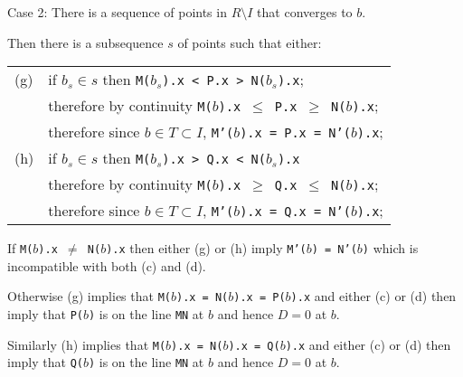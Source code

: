 \documentclass[12pt]{article}
\begin{document}
\begin{indpar}{0.3in}
Case 2: There is a sequence of points in $R\setminus I$ that
converges to $b$.

Then there is a subsequence $s$ of points such that either:
\begin{center}
\begin{tabular}{ll}
(g) & if $b_s\in s$ then {\tt M($b_s$).x < P.x > N($b_s$).x}; \\
    & therefore by continuity
            {\tt M($b$).x $\leq$ P.x $\geq$ N($b$).x}; \\
    & therefore since $b\in T\subset I$,
            {\tt M'($b$).x = P.x = N'($b$).x}; \\
(h) & if $b_s\in s$ then {\tt M($b_s$).x > Q.x < N($b_s$).x} \\
    & therefore by continuity
            {\tt M($b$).x $\geq$ Q.x $\leq$ N($b$).x}; \\
    & therefore since $b\in T\subset I$,
            {\tt M'($b$).x = Q.x = N'($b$).x}; \\
\end{tabular}
\end{center}
If {\tt M($b$).x $\neq$ N($b$).x} then either (g) or (h) imply
{\tt M'($b$) = N'($b$)} which is incompatible with both (c) and (d).

Otherwise (g) implies that {\tt M($b$).x = N($b$).x = P($b$).x} and
either (c) or (d) then imply that {\tt P($b$)} is on the line
{\tt MN} at $b$ and hence $D=0$ at $b$.

Similarly (h) implies that {\tt M($b$).x = N($b$).x = Q($b$).x} and
either (c) or (d) then imply that {\tt Q($b$)} is on the line
{\tt MN} at $b$ and hence $D=0$ at $b$.

\end{indpar}

\newpage
\end{document}
